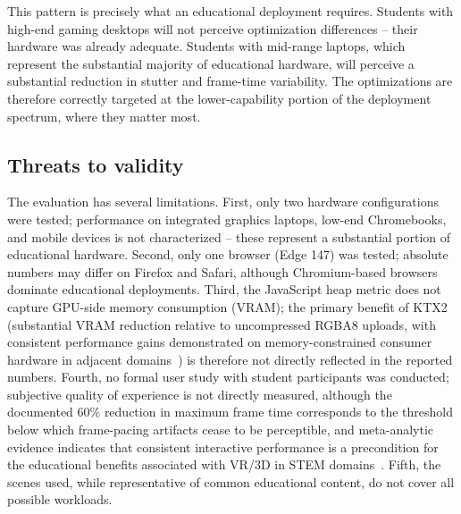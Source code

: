 This pattern is precisely what an educational deployment requires. Students with high-end gaming desktops will not perceive optimization differences -- their hardware was already adequate. Students with mid-range laptops, which represent the substantial majority of educational hardware, will perceive a substantial reduction in stutter and frame-time variability. The optimizations are therefore correctly targeted at the lower-capability portion of the deployment spectrum, where they matter most.

\subsection{Threats to validity}
The evaluation has several limitations. First, only two hardware configurations were tested; performance on integrated graphics laptops, low-end Chromebooks, and mobile devices is not characterized -- these represent a substantial portion of educational hardware. Second, only one browser (Edge 147) was tested; absolute numbers may differ on Firefox and Safari, although Chromium-based browsers dominate educational deployments. Third, the JavaScript heap metric does not capture GPU-side memory consumption (VRAM); the primary benefit of KTX2 (substantial VRAM reduction relative to uncompressed RGBA8 uploads, with consistent performance gains demonstrated on memory-constrained consumer hardware in adjacent domains~\cite{Suwandi2026,Boutsi2023}) is therefore not directly reflected in the reported numbers. Fourth, no formal user study with student participants was conducted; subjective quality of experience is not directly measured, although the documented 60\% reduction in maximum frame time corresponds to the threshold below which frame-pacing artifacts cease to be perceptible, and meta-analytic evidence indicates that consistent interactive performance is a precondition for the educational benefits associated with VR/3D in STEM domains~\cite{Yang2024}. Fifth, the scenes used, while representative of common educational content, do not cover all possible workloads.